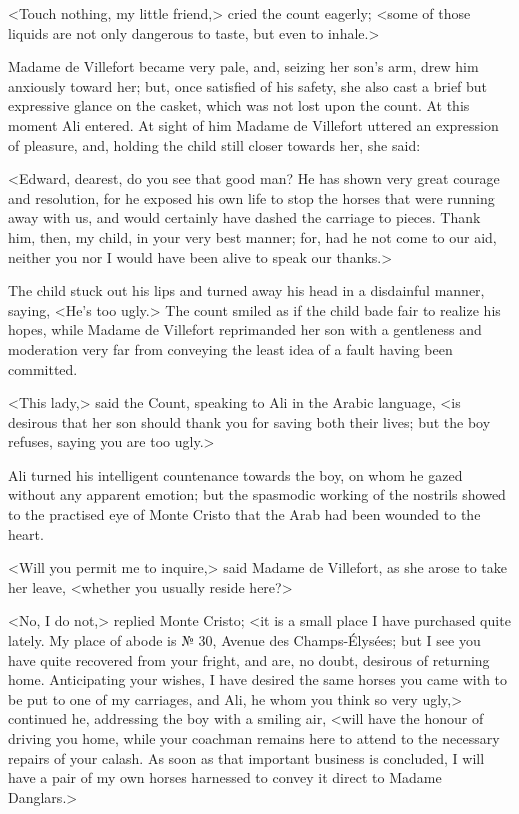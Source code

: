  <Touch nothing, my little friend,> cried the count eagerly; <some of those liquids are not only dangerous to taste, but even to inhale.> 

 Madame de Villefort became very pale, and, seizing her son's arm, drew him anxiously toward her; but, once satisfied of his safety, she also cast a brief but expressive glance on the casket, which was not lost upon the count. At this moment Ali entered. At sight of him Madame de Villefort uttered an expression of pleasure, and, holding the child still closer towards her, she said: 

 <Edward, dearest, do you see that good man? He has shown very great courage and resolution, for he exposed his own life to stop the horses that were running away with us, and would certainly have dashed the carriage to pieces. Thank him, then, my child, in your very best manner; for, had he not come to our aid, neither you nor I would have been alive to speak our thanks.> 

 The child stuck out his lips and turned away his head in a disdainful manner, saying, <He's too ugly.>  The count smiled as if the child bade fair to realize his hopes, while Madame de Villefort reprimanded her son with a gentleness and moderation very far from conveying the least idea of a fault having been committed. 

 <This lady,> said the Count, speaking to Ali in the Arabic language, <is desirous that her son should thank you for saving both their lives; but the boy refuses, saying you are too ugly.> 

 Ali turned his intelligent countenance towards the boy, on whom he gazed without any apparent emotion; but the spasmodic working of the nostrils showed to the practised eye of Monte Cristo that the Arab had been wounded to the heart. 

 <Will you permit me to inquire,> said Madame de Villefort, as she arose to take her leave, <whether you usually reside here?> 

 <No, I do not,> replied Monte Cristo; <it is a small place I have purchased quite lately. My place of abode is № 30, Avenue des Champs-Élysées; but I see you have quite recovered from your fright, and are, no doubt, desirous of returning home. Anticipating your wishes, I have desired the same horses you came with to be put to one of my carriages, and Ali, he whom you think so very ugly,> continued he, addressing the boy with a smiling air, <will have the honour of driving you home, while your coachman remains here to attend to the necessary repairs of your calash. As soon as that important business is concluded, I will have a pair of my own horses harnessed to convey it direct to Madame Danglars.> 

